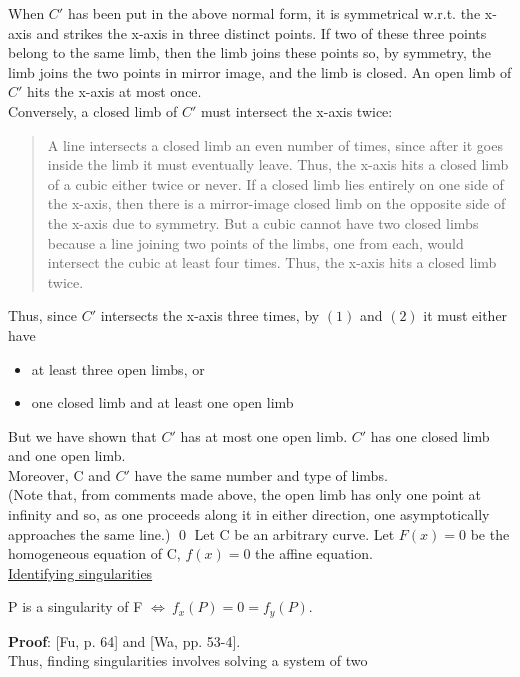 When $C'$ has been put in the above normal form, it is symmetrical w.r.t.
the x-axis and strikes the x-axis in three distinct points.
If two of these three points belong to the same limb, then the
limb joins these points so, by symmetry, the limb joins the two points
in mirror image, and the limb is closed.
%
%
\hence An open limb of $C'$ hits the
x-axis at most once.\\
Conversely, a closed limb of $C'$ must intersect the x-axis twice:
\begin{quote}
	A line intersects a closed limb an even number of times, since after 
	it goes inside the limb it must eventually leave.  Thus, the x-axis
	hits a closed limb of a cubic either twice or never.  
	If a closed limb lies entirely on one side of the x-axis, then there
	is a mirror-image closed limb on the opposite side of the x-axis due
	to symmetry.  But a cubic cannot have two closed limbs because
	a line joining two points of the limbs, one from each, would
	intersect the cubic at least four times.  Thus, the x-axis 
        hits a
	closed limb twice.
\end{quote}
Thus, since $C'$ intersects the x-axis three times, by $(1)$ and $(2)$ it
must either have
\begin{itemize}
\item
at least three open limbs, or
\item
one closed limb and at least one open limb
\end{itemize}
But we have shown that $C'$ has at most one open limb.
\hence $C'$ has one closed limb and one open limb.\\
Moreover, C and $C'$ have the same number and type of limbs.\\
(Note that, from comments made above, the open limb has only one point
at infinity and so, as one proceeds along it in either direction, one
asymptotically approaches the same line.)
\qed
Let C be an arbitrary curve.
Let $F(x) = 0$ be the homogeneous equation of C, 
$f(x) = 0$ the affine equation.\vspace{.25in} \\
\underline{Identifying singularities}
\begin{lemma} \nopagebreak
P is a singularity of F $\Leftrightarrow\ f_{x}(P) = 0 = f_{y}(P).$
\end{lemma}
{\bf Proof}:
[Fu, p. 64] and [Wa, pp. 53-4].\vspace{.25in} \\
Thus, finding singularities involves solving a system of two

